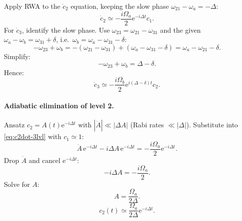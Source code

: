 \documentclass[11pt]{article}
\begin{document}
Apply RWA to the $\dot c_{2}$ equation, keeping the slow phase $\omega_{21}-\omega_{a}=-\Delta$:
\begin{equation}
\dot c_{2}\simeq -\frac{i\Omega_{a}}{2}\mathrm{e}^{-i\Delta t}c_{1}.
\label{eq:c2dot-3lvl}
\end{equation}
For $\dot c_{3}$, identify the slow phase. Use $\omega_{23}=\omega_{21}-\omega_{31}$ and the given $\omega_{a}-\omega_{b}=\omega_{31}+\delta$, i.e.\ $\omega_{b}=\omega_{a}-\omega_{31}-\delta$:
\begin{equation}
-\omega_{23}+\omega_{b}=-(\omega_{21}-\omega_{31})+(\omega_{a}-\omega_{31}-\delta)=\omega_{a}-\omega_{21}-\delta.
\end{equation}
Simplify:
\begin{equation}
-\omega_{23}+\omega_{b}=\Delta-\delta.
\end{equation}
Hence:
\begin{equation}
\dot c_{3}\simeq -\frac{i\Omega_{b}}{2}\mathrm{e}^{i(\Delta-\delta)t}c_{2}.
\label{eq:c3dot-3lvl}
\end{equation}

\paragraph{Adiabatic elimination of level 2.} Ansatz $c_{2}=A(t)\mathrm{e}^{-i\Delta t}$ with $|\dot A|\ll|\Delta A|$ (Rabi rates $\ll |\Delta|$). Substitute into \eqref{eq:c2dot-3lvl} with $c_{1}\simeq 1$:
\begin{equation}
\dot A\,\mathrm{e}^{-i\Delta t}-i\Delta A\,\mathrm{e}^{-i\Delta t}=-\frac{i\Omega_{a}}{2}\mathrm{e}^{-i\Delta t}.
\end{equation}
Drop $\dot A$ and cancel $\mathrm{e}^{-i\Delta t}$:
\begin{equation}
-i\Delta A=-\frac{i\Omega_{a}}{2}.
\end{equation}
Solve for $A$:
\begin{equation}
A=\frac{\Omega_{a}}{2\Delta}.
\end{equation}
\begin{equation}
c_{2}(t)\simeq \frac{\Omega_{a}}{2\Delta}\mathrm{e}^{-i\Delta t}.
\label{eq:c2-adiab}
\end{equation}
\end{document}
